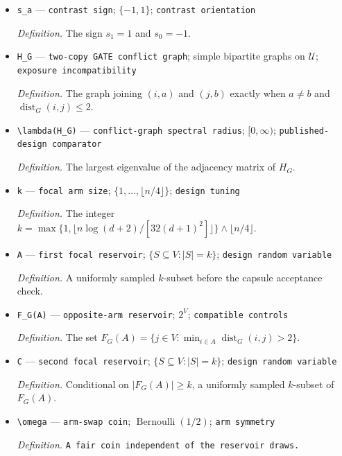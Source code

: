 \documentclass{article}
\begin{document}
\begin{itemize}
  \item \texttt{s\_\allowbreak{}a} --- \texttt{contrast sign}; \(\{-1,1\}\); \texttt{contrast orientation}
  \par\smallskip\noindent\emph{Definition.} The sign \(s_1=1\) and \(s_0=-1\).
  \item \texttt{H\_\allowbreak{}G} --- \texttt{two-\allowbreak{}copy GATE conflict graph}; simple bipartite graphs on \(\mathcal U\); \texttt{exposure incompatibility}
  \par\smallskip\noindent\emph{Definition.} The graph joining \((i,a)\) and \((j,b)\) exactly when \(a\ne b\) and \(\operatorname{dist}_G(i,j)\le 2\).
  \item \texttt{\textbackslash{}\allowbreak{}lambda(H\_\allowbreak{}G)} --- \texttt{conflict-\allowbreak{}graph spectral radius}; \([0,\infty)\); \texttt{published-\allowbreak{}design comparator}
  \par\smallskip\noindent\emph{Definition.} The largest eigenvalue of the adjacency matrix of \(H_G\).
  \item \texttt{k} --- \texttt{focal arm size}; \(\{1,\ldots,\lfloor n/4\rfloor\}\); \texttt{design tuning}
  \par\smallskip\noindent\emph{Definition.} The integer \(k=\max\{1,\lfloor n\log(d+2)/[32(d+1)^2]\rfloor\}\wedge\lfloor n/4\rfloor\).
  \item \texttt{A} --- \texttt{first focal reservoir}; \(\{S\subseteq V:|S|=k\}\); \texttt{design random variable}
  \par\smallskip\noindent\emph{Definition.} A uniformly sampled \(k\)-subset before the capsule acceptance check.
  \item \texttt{F\_\allowbreak{}G(A)} --- \texttt{opposite-\allowbreak{}arm reservoir}; \(2^V\); \texttt{compatible controls}
  \par\smallskip\noindent\emph{Definition.} The set \(F_G(A)=\{j\in V:\min_{i\in A}\operatorname{dist}_G(i,j)>2\}\).
  \item \texttt{C} --- \texttt{second focal reservoir}; \(\{S\subseteq V:|S|=k\}\); \texttt{design random variable}
  \par\smallskip\noindent\emph{Definition.} Conditional on \(|F_G(A)|\ge k\), a uniformly sampled \(k\)-subset of \(F_G(A)\).
  \item \texttt{\textbackslash{}\allowbreak{}omega} --- \texttt{arm-\allowbreak{}swap coin}; \(\operatorname{Bernoulli}(1/2)\); \texttt{arm symmetry}
  \par\smallskip\noindent\emph{Definition.} \texttt{A fair coin independent of the reservoir draws.}

\end{itemize}
\end{document}
